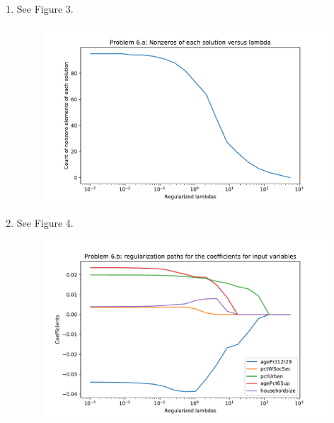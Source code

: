 \begin{enumerate}
    \item See Figure 3.
	\begin{figure}[h!]
	    \centering
	    \includegraphics[width=0.5\linewidth]{images/P6_a.pdf}
	    \caption{}
	\end{figure}
    \item See Figure 4.
	\begin{figure}[h!]
	    \centering
	    \includegraphics[width=0.5\linewidth]{images/P6_b.pdf}
	    \caption{}
	\end{figure}


\end{enumerate}
